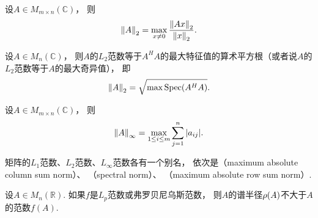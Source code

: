 \begin{theorem}%
设\(A \in M_{m \times n}(\mathbb{C})\)，
则\begin{equation*}
	\norm{A}_2
	= \max_{x\neq0} \frac{\norm{Ax}_2}{\norm{x}_2}.
\end{equation*}
\end{theorem}

\begin{theorem}
设\(A \in M_n(\mathbb{C})\)，
则\(A\)的\(L_2\)范数等于\(A^H A\)的最大特征值的算术平方根（或者说\(A\)的\(L_2\)范数等于\(A\)的最大奇异值），
即\begin{equation*}
	\norm{A}_2
	= \sqrt{
		\max\operatorname{Spec}(A^H A)
	}.
\end{equation*}
\end{theorem}

\begin{theorem}%
设\(A \in M_{m \times n}(\mathbb{C})\)，
则\begin{equation*}
	\norm{A}_\infty
	= \max_{1 \leq i \leq m} \sum_{j=1}^n \abs{a_{ij}}.
\end{equation*}
\end{theorem}

矩阵的\(L_1\)范数、\(L_2\)范数、\(L_\infty\)范数各有一个别名，
依次是（maximum absolute column sum norm）、%
（spectral norm）、%
（maximum absolute row sum norm）.

\begin{theorem}
设\(A \in M_n(\mathbb{R})\).
如果\(f\)是\(L_p\)范数或弗罗贝尼乌斯范数，
则\(A\)的谱半径\(\operatorname{\rho}(A)\)不大于\(A\)的范数\(f(A)\).
\end{theorem}



